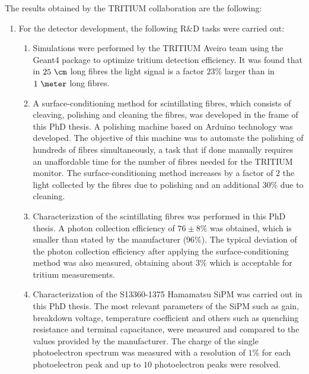 The results obtained by the TRITIUM collaboration are the following:

\begin{enumerate}
\item{} For the detector development, the following R$\&$D tasks were carried out:

\begin{enumerate}
\item{} Simulations were performed by the TRITIUM Aveiro team using the Geant4 package to optimize tritium detection efficiency. It was found that in $25~\cm$ long fibres the light signal is a factor $23\%$ larger than in $1~\meter$ long fibres. %

\item{} A surface-conditioning method for scintillating fibres, which consists of cleaving, polishing and cleaning the fibres, was developed in the frame of this PhD thesis. A polishing machine based on Arduino technology was developed. The objective of this machine was to automate the polishing of hundreds of fibres simultaneously, a task that if done manually requires an unaffordable time for the number of fibres needed for the TRITIUM monitor. The surface-conditioning method increases by a factor of $2$ the light collected by the fibres due to polishing and an additional $30\%$ due to cleaning. 

\item{} Characterization of the scintillating fibres was performed in this PhD thesis. A photon collection efficiency of $76\pm 8\%$ was obtained, which is smaller than stated by the manufacturer ($96\%$). The typical deviation of the photon collection efficiency after applying the surface-conditioning method was also measured, obtaining about $3\%$ which is acceptable for tritium measurements.

\item{} Characterization of the S13360-1375 Hamamatsu SiPM was carried out in this PhD thesis. The most relevant parameters of the SiPM such as gain, breakdown voltage, temperature coefficient and others such as quenching resistance and terminal capacitance, were measured and compared to the values provided by the manufacturer. The charge of the single photoelectron spectrum was measured with a resolution of $1\%$ for each photoelectron peak and up to $10$ photoelectron peaks were resolved. %


\end{enumerate}
\end{enumerate}

